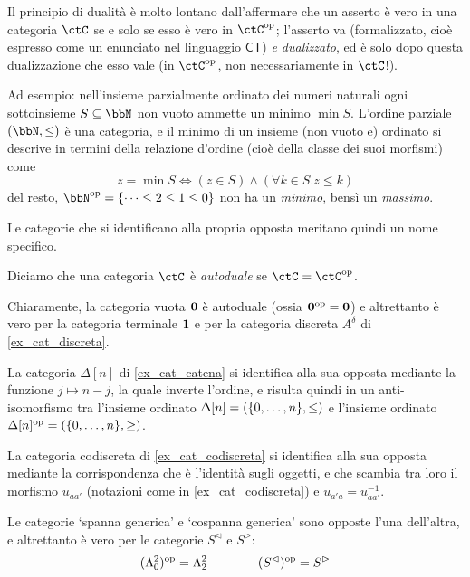\begin{remark}
	Il principio di dualità è molto lontano dall'affermare che un asserto è vero in una categoria \(\ctC\) se e solo se esso è vero in \(\ctC^\op\); l'asserto va (formalizzato, cioè espresso come un enunciato nel linguaggio \(\mathsf{CT}\)) \emph{e dualizzato}, ed è solo dopo questa dualizzazione che esso vale (in \(\ctC^\op\), non necessariamente in \(\ctC\)!).

	Ad esempio: nell'insieme parzialmente ordinato dei numeri naturali ogni sottoinsieme \(S\subseteq\bbN\) non vuoto ammette un minimo \(\min S\). L'ordine parziale \((\bbN,\le)\) è una categoria, e il minimo di un insieme (non vuoto e) ordinato si descrive in termini della relazione d'ordine (cioè della classe dei suoi morfismi) come
	\[z = \min S \iff (z\in S)\land (\forall k\in S.z\le k)\]
	del resto, \(\bbN^\op = \{\dots\le 2 \le 1 \le 0\}\) non ha un \emph{minimo}, bensì un \emph{massimo}.
\end{remark}
Le categorie che si identificano alla propria opposta meritano quindi un nome specifico.
\begin{definition}
	Diciamo che una categoria \(\ctC\) è \emph{autoduale} se \(\ctC=\ctC^\op\).
\end{definition}
\begin{example}
	Chiaramente, la categoria vuota \(\mathbf{0}\) è autoduale (ossia \(\mathbf{0}^{\text{op}}=\mathbf{0}\)) e altrettanto è vero per la categoria terminale \(\mathbf{1}\) e per la categoria discreta \(A^\delta\) di \ref{ex_cat_discreta}.

	La categoria \(\Delta[n]\) di \ref{ex_cat_catena} si identifica alla sua opposta mediante la funzione \(j\mapsto n-j\), la quale inverte l'ordine, e risulta quindi in un anti-isomorfismo tra l'insieme ordinato \(\Delta[n]=(\{\iter[0]n\},\le)\) e l'insieme ordinato \(\Delta[n]^\op = (\{\iter[0]n\},\ge)\).

	La categoria codiscreta di \ref{ex_cat_codiscreta} si identifica alla sua opposta mediante la corrispondenza che è l'identità sugli oggetti, e che scambia tra loro il morfismo \(u_{aa'}\) (notazioni come in \ref{ex_cat_codiscreta}) e \(u_{a'a} = u_{aa'}^{-1}\).

	Le categorie `spanna generica' e `cospanna generica' sono opposte l'una dell'altra, e altrettanto è vero per le categorie \(S^\lhd\) e \(S^\rhd\):
	\[(\Lambda^2_0)^{\text{op}} = \Lambda^2_2\qquad\qquad (S^\lhd)^{\text{op}} = S^\rhd\]
\end{example}
